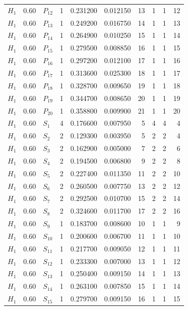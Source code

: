 \begin{longtable}{lrlrrrrrrr}
$H_1$ & 0.60 & $P_{12}$ & 1 & 0.231200 & 0.012150 & 13 & 1 & 1 & 12\\
$H_1$ & 0.60 & $P_{13}$ & 1 & 0.249200 & 0.016750 & 14 & 1 & 1 & 13\\
$H_1$ & 0.60 & $P_{14}$ & 1 & 0.264900 & 0.010250 & 15 & 1 & 1 & 14\\
$H_1$ & 0.60 & $P_{15}$ & 1 & 0.279500 & 0.008850 & 16 & 1 & 1 & 15\\
$H_1$ & 0.60 & $P_{16}$ & 1 & 0.297200 & 0.012100 & 17 & 1 & 1 & 16\\
$H_1$ & 0.60 & $P_{17}$ & 1 & 0.313600 & 0.025300 & 18 & 1 & 1 & 17\\
$H_1$ & 0.60 & $P_{18}$ & 1 & 0.328700 & 0.009650 & 19 & 1 & 1 & 18\\
$H_1$ & 0.60 & $P_{19}$ & 1 & 0.344700 & 0.008650 & 20 & 1 & 1 & 19\\
$H_1$ & 0.60 & $P_{20}$ & 1 & 0.358800 & 0.009900 & 21 & 1 & 1 & 20\\
$H_1$ & 0.60 & $S_{1}$ & 4 & 0.176600 & 0.007950 & 5 & 4 & 4 & 4\\
$H_1$ & 0.60 & $S_{2}$ & 2 & 0.129300 & 0.003950 & 5 & 2 & 2 & 4\\
$H_1$ & 0.60 & $S_{3}$ & 2 & 0.162900 & 0.005000 & 7 & 2 & 2 & 6\\
$H_1$ & 0.60 & $S_{4}$ & 2 & 0.194500 & 0.006800 & 9 & 2 & 2 & 8\\
$H_1$ & 0.60 & $S_{5}$ & 2 & 0.227400 & 0.011350 & 11 & 2 & 2 & 10\\
$H_1$ & 0.60 & $S_{6}$ & 2 & 0.260500 & 0.007750 & 13 & 2 & 2 & 12\\
$H_1$ & 0.60 & $S_{7}$ & 2 & 0.292500 & 0.010700 & 15 & 2 & 2 & 14\\
$H_1$ & 0.60 & $S_{8}$ & 2 & 0.324600 & 0.011700 & 17 & 2 & 2 & 16\\
$H_1$ & 0.60 & $S_{9}$ & 1 & 0.183700 & 0.008600 & 10 & 1 & 1 & 9\\
$H_1$ & 0.60 & $S_{10}$ & 1 & 0.200600 & 0.006700 & 11 & 1 & 1 & 10\\
$H_1$ & 0.60 & $S_{11}$ & 1 & 0.217700 & 0.009050 & 12 & 1 & 1 & 11\\
$H_1$ & 0.60 & $S_{12}$ & 1 & 0.233300 & 0.007000 & 13 & 1 & 1 & 12\\
$H_1$ & 0.60 & $S_{13}$ & 1 & 0.250400 & 0.009150 & 14 & 1 & 1 & 13\\
$H_1$ & 0.60 & $S_{14}$ & 1 & 0.263100 & 0.007850 & 15 & 1 & 1 & 14\\
$H_1$ & 0.60 & $S_{15}$ & 1 & 0.279700 & 0.009150 & 16 & 1 & 1 & 15\\

\end{longtable}
